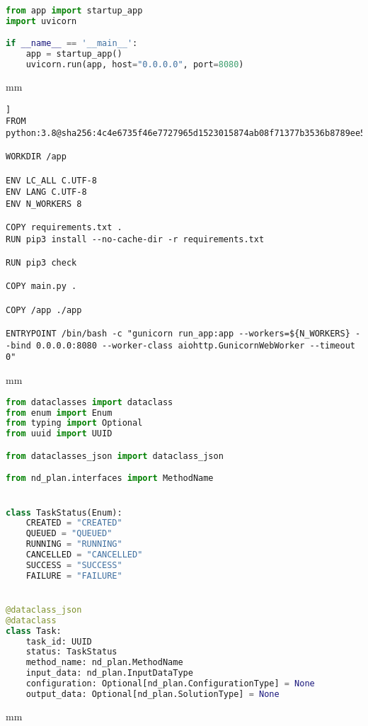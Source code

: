 \begin{lstlisting}[language=Python, caption=main.py, captionpos=b]
from app import startup_app
import uvicorn

if __name__ == '__main__':
    app = startup_app()
    uvicorn.run(app, host="0.0.0.0", port=8080)
\end{lstlisting}

 mm
\begin{lstlisting}[caption=Dockerfile, captionpos=b]]
FROM python:3.8@sha256:4c4e6735f46e7727965d1523015874ab08f71377b3536b8789ee5742fc737059

WORKDIR /app

ENV LC_ALL C.UTF-8
ENV LANG C.UTF-8
ENV N_WORKERS 8

COPY requirements.txt .
RUN pip3 install --no-cache-dir -r requirements.txt

RUN pip3 check

COPY main.py .

COPY /app ./app

ENTRYPOINT /bin/bash -c "gunicorn run_app:app --workers=${N_WORKERS} --bind 0.0.0.0:8080 --worker-class aiohttp.GunicornWebWorker --timeout 0"
\end{lstlisting}

 mm
\begin{lstlisting}[language=Python, caption=domain/model.py, captionpos=b]
from dataclasses import dataclass
from enum import Enum
from typing import Optional
from uuid import UUID

from dataclasses_json import dataclass_json

from nd_plan.interfaces import MethodName


class TaskStatus(Enum):
    CREATED = "CREATED"
    QUEUED = "QUEUED"
    RUNNING = "RUNNING"
    CANCELLED = "CANCELLED"
    SUCCESS = "SUCCESS"
    FAILURE = "FAILURE"


@dataclass_json
@dataclass
class Task:
    task_id: UUID
    status: TaskStatus
    method_name: nd_plan.MethodName
    input_data: nd_plan.InputDataType
    configuration: Optional[nd_plan.ConfigurationType] = None
    output_data: Optional[nd_plan.SolutionType] = None
\end{lstlisting}

 mm

